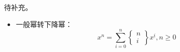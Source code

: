 待补充。

\begin{itemize}
    \item 一般幂转下降幂： $$x^n=\sum\limits_{i=0}^n\begin{Bmatrix}n\\i\end{Bmatrix}x^{\underline{i}},n\geq 0$$
\end{itemize}